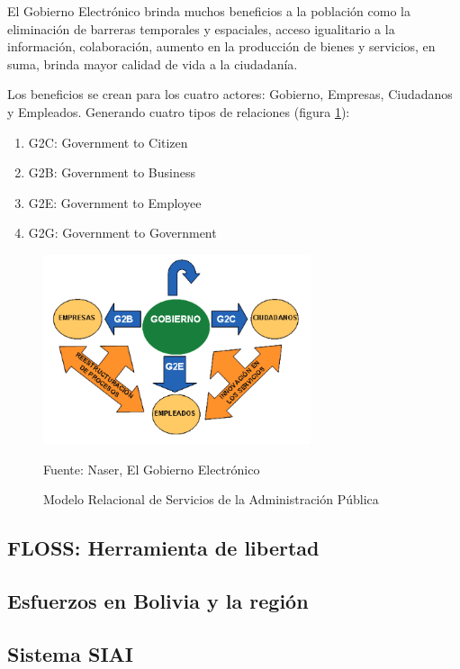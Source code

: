 El Gobierno Electrónico brinda muchos beneficios a la población como la eliminación de barreras temporales y espaciales, acceso igualitario a la información, colaboración, aumento en la producción de bienes y servicios, en suma, brinda mayor calidad de vida a la ciudadanía.

Los beneficios se crean para los cuatro actores: Gobierno, Empresas, Ciudadanos y Empleados. Generando cuatro tipos de relaciones (figura \ref{fig:g2all}):

\begin{enumerate}
    \item G2C: Government to Citizen
    \item G2B: Government to Business
    \item G2E: Government to Employee
    \item G2G: Government to Government
\end{enumerate}

\begin{figure}[!h]
    \centering
    \includegraphics[width=0.7\textwidth]{assets/g2all}
    \caption{Modelo Relacional de Servicios de la Administración Pública}{Fuente: Naser, El Gobierno Electrónico}
    \label{fig:g2all}
\end{figure}

\subsection{FLOSS: Herramienta de libertad}

\subsection{Esfuerzos en Bolivia y la región}

\subsection{Sistema SIAI}

